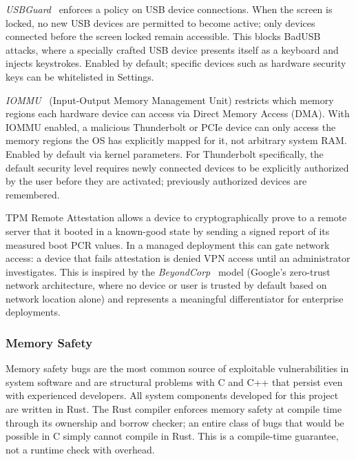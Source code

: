 \emph{USBGuard}~\cite{usbguard} enforces a policy on USB device connections. When the screen
is locked, no new USB devices are permitted to become active; only devices
connected before the screen locked remain accessible. This blocks BadUSB
attacks, where a specially crafted USB device presents itself as a keyboard
and injects keystrokes. Enabled by default; specific devices such as hardware
security keys can be whitelisted in Settings.

\emph{IOMMU}~\cite{archwiki:iommu} (Input-Output Memory Management Unit)
restricts which memory regions each hardware device can access via Direct
Memory Access (DMA). With IOMMU enabled, a malicious Thunderbolt or
PCIe device can only access the memory regions the OS has explicitly mapped
for it, not arbitrary system RAM. Enabled by default via kernel parameters.
For Thunderbolt specifically, the default security level requires newly
connected devices to be explicitly authorized by the user before they are
activated; previously authorized devices are remembered.

TPM Remote Attestation allows a device to cryptographically prove to a remote
server that it booted in a known-good state by sending a signed report of its
measured boot PCR values. In a managed deployment this can gate network access:
a device that fails attestation is denied VPN access until an administrator
investigates. This is inspired by the \emph{BeyondCorp}~\cite{beyondcorp} model
(Google's zero-trust network architecture, where no device or user is trusted
by default based on network location alone) and represents a meaningful
differentiator for enterprise deployments.

\subsubsection{Memory Safety}
\label{sec:memory-safety}

Memory safety bugs are the most common source of exploitable vulnerabilities
in system software and are structural problems with C and C++ that persist even
with experienced developers. All system components developed for this project
are written in Rust. The Rust compiler enforces memory safety at compile time
through its ownership and borrow checker; an entire class of bugs that would
be possible in C simply cannot compile in Rust. This is a compile-time
guarantee, not a runtime check with overhead.

